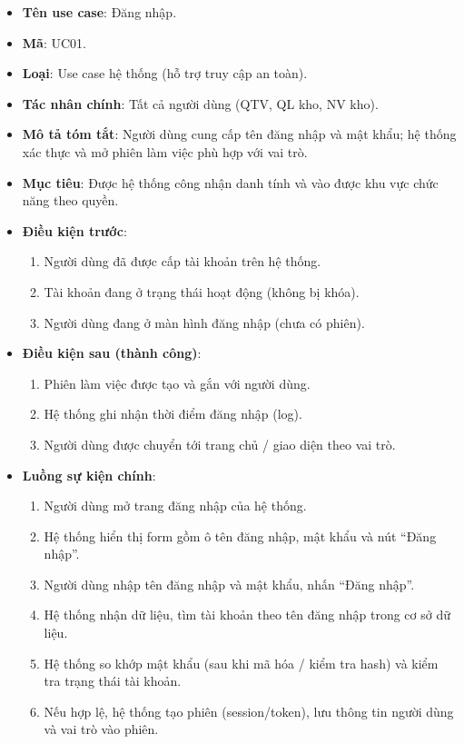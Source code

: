 \begin{itemize}[leftmargin=1.5cm]
    \item \textbf{Tên use case}: Đăng nhập.
    \item \textbf{Mã}: UC01.
    \item \textbf{Loại}: Use case hệ thống (hỗ trợ truy cập an toàn).
    \item \textbf{Tác nhân chính}: Tất cả người dùng (QTV, QL kho, NV kho).
    \item \textbf{Mô tả tóm tắt}: Người dùng cung cấp tên đăng nhập và mật khẩu; hệ thống xác thực và mở phiên làm việc phù hợp với vai trò.
    \item \textbf{Mục tiêu}: Được hệ thống công nhận danh tính và vào được khu vực chức năng theo quyền.
    \item \textbf{Điều kiện trước}:
    \begin{enumerate}
        \item Người dùng đã được cấp tài khoản trên hệ thống.
        \item Tài khoản đang ở trạng thái hoạt động (không bị khóa).
        \item Người dùng đang ở màn hình đăng nhập (chưa có phiên).
    \end{enumerate}
    \item \textbf{Điều kiện sau (thành công)}:
    \begin{enumerate}
        \item Phiên làm việc được tạo và gắn với người dùng.
        \item Hệ thống ghi nhận thời điểm đăng nhập (log).
        \item Người dùng được chuyển tới trang chủ / giao diện theo vai trò.
    \end{enumerate}
    \item \textbf{Luồng sự kiện chính}:
    \begin{enumerate}
        \item Người dùng mở trang đăng nhập của hệ thống.
        \item Hệ thống hiển thị form gồm ô tên đăng nhập, mật khẩu và nút ``Đăng nhập''.
        \item Người dùng nhập tên đăng nhập và mật khẩu, nhấn ``Đăng nhập''.
        \item Hệ thống nhận dữ liệu, tìm tài khoản theo tên đăng nhập trong cơ sở dữ liệu.
        \item Hệ thống so khớp mật khẩu (sau khi mã hóa / kiểm tra hash) và kiểm tra trạng thái tài khoản.
        \item Nếu hợp lệ, hệ thống tạo phiên (session/token), lưu thông tin người dùng và vai trò vào phiên.

\end{enumerate}
\end{itemize}
